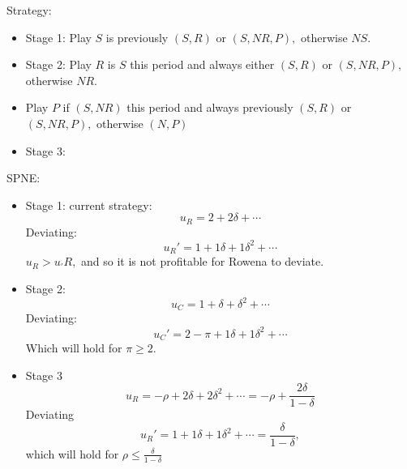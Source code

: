 \documentclass[10pt, oneside]{article}
\theoremstyle{definition}
\begin{document}
Strategy: 
\begin{itemize}
    \item Stage 1: Play $S$ is previously $(S,R)$ or $(S, NR, P),$ otherwise $NS.$
    \item Stage 2: Play $R$ is $S$ this period and always either $(S,R)$ or $(S,NR, P),$ otherwise $NR.$
    \item Play $P$ if $(S,NR)$ this period and always previously $(S,R)$ or $(S,NR, P),$ otherwise $(N,P)$
    \item Stage 3:
\end{itemize}
SPNE:
\begin{itemize}
    \item Stage 1: current strategy:
    \[u_R = 2 + 2\delta + \cdots\]
    Deviating:
    \[u_R' = 1 + 1\delta + 1\delta^2 + \cdots\]
    $u_R >u_'R,$ and so it is not profitable for Rowena to deviate.
    \item Stage 2: 
    \[u_C = 1 + \delta + \delta^2 + \cdots\]
    Deviating:
    \[u_C' = 2 -\pi+ 1\delta + 1\delta^2 + \cdots\]
    Which will hold for $\pi \geq 2.$
    \item Stage 3
    \[u_R = -\rho + 2\delta + 2\delta^2 + \cdots = 
 - \rho + \frac{2\delta}{1-\delta}\]
    Deviating
    \[u_R' = 1 + 1\delta + 1\delta^2 + \cdots = \frac{\delta}{1-\delta},\] which will hold for $\rho \leq \frac{\delta}{1-\delta}$
\end{itemize}
\end{document}
